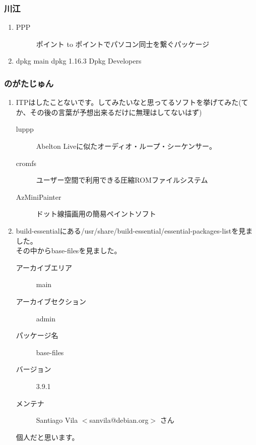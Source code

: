 \documentclass[cjk,dvipdfmx,10pt,%
hyperref={bookmarks=true,bookmarksnumbered=true,bookmarksopen=false,%
colorlinks=false,%
pdftitle={第 59 回 関西 Debian 勉強会},%
pdfauthor={倉敷・のがた・かわだ・佐々木},%
pdfsubject={資料},%
}]{beamer}
\begin{document}
\begin{frame}
    \frametitle{ 川江 }
  \begin{enumerate}
  \item
    \begin{description}
    \item [PPP] ポイント to ポイントでパソコン同士を繋ぐパッケージ
    \end{description}
  \item dpkg main dpkg 1.16.3 Dpkg Developers
  \end{enumerate}
\end{frame}

\begin{frame}
  \frametitle{ のがたじゅん }
  \begin{enumerate}
  \item ITPはしたことないです。してみたいなと思ってるソフトを挙げてみた(てか、その後の言葉が予想出来るだけに無理はしてないはず)
    \begin{description}
    \item [luppp] Abelton Liveに似たオーディオ・ループ・シーケンサー。
    \item [cromfs] ユーザー空間で利用できる圧縮ROMファイルシステム
    \item [AzMiniPainter] ドット線描画用の簡易ペイントソフト
    \end{description}
  \item build-essentialにある/usr/share/build-essential/essential-packages-listを見ました。\\
    その中からbase-filesを見ました。
    \begin{description}
    \item [アーカイブエリア] main
    \item [アーカイブセクション] admin
    \item [パッケージ名] base-files
    \item [バージョン] 3.9.1
    \item [メンテナ] Santiago Vila $<$sanvila@debian.org$>$ さん
    \end{description}
    個人だと思います。
  \end{enumerate}
\end{frame}
\end{document}
